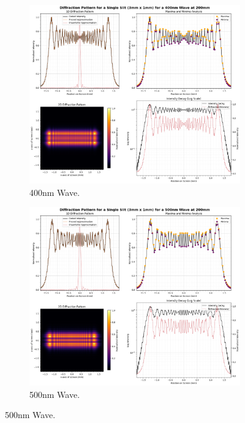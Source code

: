 \documentclass[12pt]{article}
\begin{document}
\begin{figure}[H]
    \centering
    \begin{subfigure}[b]{.48\textwidth}
        \centering
        \includegraphics[width=\linewidth]{hsslit_400nm.png}
        \caption{400nm Wave.}
        \label{fig:11a}
    \end{subfigure}
    \hspace{-.5em}
    \begin{subfigure}[b]{.48\textwidth}
        \centering
        \includegraphics[width=\linewidth]{hsslit_500nm.png}
        \caption{500nm Wave.}
        \label{fig:11b}
    \end{subfigure}
\end{figure}
\end{document}
